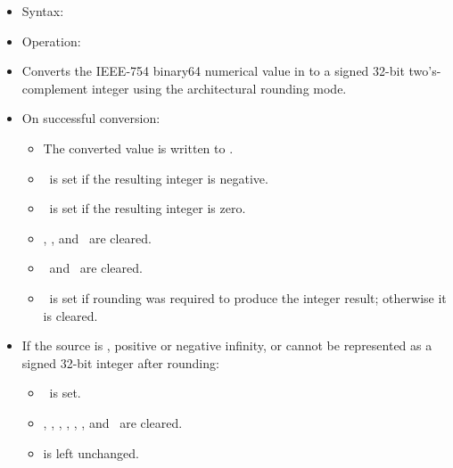\begin{itemize}
\item Syntax: 
\item Operation: 
\item Converts the IEEE-754 binary64 numerical value in  to a
      signed 32-bit two's-complement integer using the architectural
      rounding mode.
\item On successful conversion:
      \begin{itemize}
      \item The converted value is written to .
      \item \flagN\ is set if the resulting integer is negative.
      \item \flagZ\ is set if the resulting integer is zero.
      \item \flagC, \flagV, and \flagE\ are cleared.
      \item \flagI\ and \flagU\ are cleared.
      \item \flagX\ is set if rounding was required to produce the integer result;
      otherwise it is cleared.
      \end{itemize}
\item If the source is , positive or negative infinity, or cannot
be represented as a signed 32-bit integer after rounding:
      \begin{itemize}
      \item \flagE\ is set.
      \item \flagN, \flagZ, \flagC, \flagV, \flagI, \flagU, and \flagX\ are cleared.
      \item {} is left unchanged.
      \end{itemize}
\end{itemize}

\subsection{}

